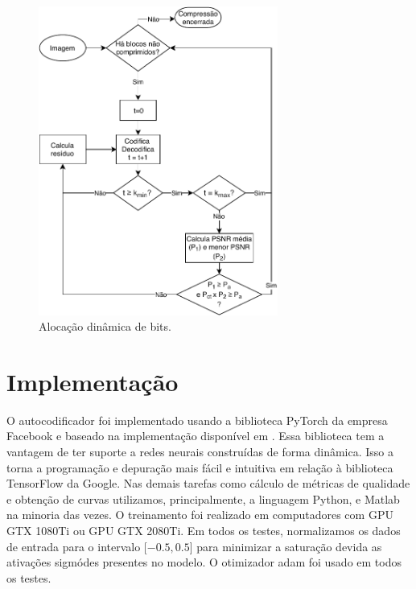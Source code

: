 \begin{figure}
\centering
\includegraphics[width=0.7\textwidth]{figuras/fluxograma.pdf}
\caption{Alocação dinâmica de bits.}
\label{fig:flux_vr}
\end{figure}		


\section{Implementação}
O autocodificador foi implementado usando a biblioteca PyTorch da empresa Facebook e baseado na implementação disponível em \cite{implementationRNNPytorch}. Essa biblioteca tem a vantagem de ter suporte a redes neurais construídas de forma dinâmica. Isso a torna a programação e depuração mais fácil e intuitiva em relação à biblioteca TensorFlow da Google. 
Nas demais tarefas como cálculo de métricas de qualidade e obtenção de curvas utilizamos, principalmente, a linguagem Python, e Matlab na minoria das vezes. O treinamento foi realizado em computadores com  GPU GTX 1080Ti ou GPU GTX 2080Ti. 
Em todos os testes, normalizamos os dados de entrada para o intervalo [$-0.5,0.5$] para minimizar a saturação devida as ativações sigmódes presentes no modelo. O otimizador \acrshort{adam} foi usado em todos os testes.   